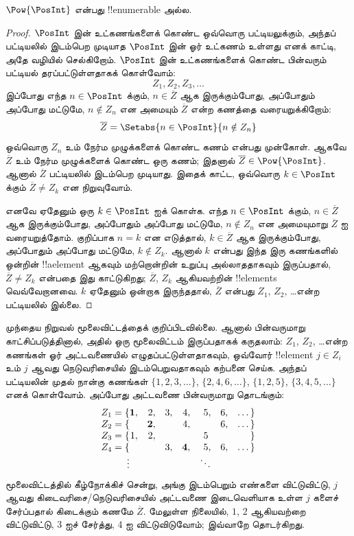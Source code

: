 \documentclass[../../../include/open-logic-section]{subfiles}
\begin{document}
\begin{thm}
$\Pow{\PosInt}$ என்பது !!{enumerable} அல்ல.
\end{thm}

\begin{proof}
$\PosInt$ இன் உட்கணங்களைக் கொண்ட ஒவ்வொரு பட்டியலுக்கும்,
அந்தப் பட்டியலில் இடம்பெற முடியாத $\PosInt$ இன் ஓர் உட்கணம்
உள்ளது எனக் காட்டி, அதே வழியில் செல்கிறோம்.
$\PosInt$ இன் உட்கணங்களைக் கொண்ட பின்வரும் பட்டியல்
தரப்பட்டுள்ளதாகக் கொள்வோம்:
\[
Z_{1}, Z_{2}, Z_{3}, \dots
\]
இப்போது எந்த $n \in \PosInt$ க்கும்,
$n \in \overline{Z}$ ஆக இருக்கும்போது, அப்போதும் அப்போது மட்டுமே,
$n \notin Z_{n}$ என அமையும் $\overline{Z}$ என்ற கணத்தை
வரையறுக்கிறோம்:
\[
\overline{Z} = \Setabs{n \in \PosInt}{n \notin Z_n}
\]
ஒவ்வொரு $Z_n$ உம் நேர்ம முழுக்களைக் கொண்ட கணம் என்பது முன்கோள்.
ஆகவே $\overline{Z}$ உம் நேர்ம முழுக்களைக் கொண்ட ஒரு கணம்;
இதனால் $\overline{Z} \in
\Pow{\PosInt}$.
ஆனால் $\overline{Z}$ பட்டியலில் இடம்பெற முடியாது.
இதைக் காட்ட, ஒவ்வொரு $k \in \PosInt$ க்கும்
$\overline{Z} \neq
Z_k$ என நிறுவுவோம்.

எனவே ஏதேனும் ஒரு $k \in \PosInt$ ஐக் கொள்க.
எந்த $n \in \PosInt$ க்கும்,
$n \in \overline{Z}$ ஆக இருக்கும்போது, அப்போதும் அப்போது மட்டுமே,
$n \notin Z_n$ என அமையுமாறு $\overline{Z}$ ஐ வரையறுத்தோம்.
குறிப்பாக $n=k$ என எடுத்தால்,
$k \in \overline{Z}$ ஆக இருக்கும்போது, அப்போதும் அப்போது மட்டுமே,
$k \notin Z_k$.
ஆனால் $k$ என்பது இந்த இரு கணங்களில் ஒன்றின் !!a{element} ஆகவும்
மற்றொன்றின் உறுப்பு அல்லாததாகவும் இருப்பதால்,
$\overline{Z} \neq Z_k$ என்பதை இது காட்டுகிறது;
$\overline{Z}$, $Z_k$ ஆகியவற்றின் !!{element}s வெவ்வேறானவை.
$k$ ஏதேனும் ஒன்றாக இருந்ததால்,
$\overline{Z}$ என்பது $Z_1$, $Z_2$, \dots என்ற பட்டியலில் இல்லை.
\end{proof}

\begin{explain}
முந்தைய நிறுவல் மூலைவிட்டத்தைக் குறிப்பிடவில்லை.
ஆனால் பின்வருமாறு காட்சிப்படுத்தினால், அதில் ஒரு மூலைவிட்டம்
இருப்பதாகக் கருதலாம்:
$Z_1$, $Z_2$, \dots என்ற கணங்கள் ஓர் அட்டவணையில் எழுதப்பட்டுள்ளதாகவும்,
ஒவ்வோர் !!{element} $j \in Z_i$ உம் $j$ ஆவது நெடுவரிசையில்
இடம்பெறுவதாகவும் கற்பனை செய்க.
அந்தப் பட்டியலின் முதல் நான்கு கணங்கள்
$\{1,2,3,\dots\}$, $\{2, 4, 6, \dots\}$,
$\{1,2,5\}$, $\{3,4,5,\dots\}$ எனக் கொள்வோம்.
அப்போது அட்டவணை பின்வருமாறு தொடங்கும்:
\[
\begin{array}{r@{}rrrrrrr}
  Z_1 = \{ & \mathbf{1}, & 2, & 3, & 4, & 5, & 6, & \dots\}\\
  Z_2 = \{ &  & \mathbf{2}, &  & 4, &  & 6, & \dots\}\\
  Z_3 = \{ & 1, & 2, &  &  & 5\phantom{,} &  & \}\\
  Z_4 = \{ &  &  & 3, & \mathbf{4}, & 5, & 6, & \dots\}\\
  \vdots & & & & & \ddots
\end{array}
\]
மூலைவிட்டத்தில் கீழ்நோக்கிச் சென்று, அங்கு இடம்பெறும் எண்களை
விட்டுவிட்டு, $j$ ஆவது கிடைவரிசை/நெடுவரிசையில் அட்டவணை
இடைவெளியாக உள்ள $j$ களைச் சேர்ப்பதால் கிடைக்கும் கணமே
$\overline{Z}$.
மேலுள்ள நிலையில், $1$, $2$ ஆகியவற்றை விட்டுவிட்டு,
$3$ ஐச் சேர்த்து, $4$ ஐ விட்டுவிடுவோம்; இவ்வாறே தொடர்கிறது.
\end{explain}
\end{document}
